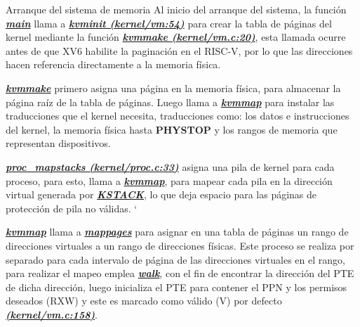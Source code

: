 \documentclass{libs/ufc_format}
\begin{document}
\begin{frame}{Arranque del sistema de memoria}
    Al inicio del arranque del sistema, la función \href{https://github.com/CarlosSandoval-03/xv6-riscv/blob/riscv/kernel/main.c\#L20}{\textbf{\textit{main}}} llama a \href{https://github.com/CarlosSandoval-03/xv6-riscv/blob/riscv/kernel/vm.c\#L54}{\textbf{\textit{kvminit (kernel/vm:54)}}} para crear la tabla de páginas del kernel mediante la función \href{https://github.com/CarlosSandoval-03/xv6-riscv/blob/riscv/kernel/vm.c\#L20}{\textbf{\textit{kvmmake (kernel/vm.c:20)}}}, esta llamada ocurre antes de que XV6 habilite la paginación en el RISC-V, por lo que las direcciones hacen referencia directamente a la memoria física.

    \vspace{0.3cm}

    \href{https://github.com/CarlosSandoval-03/xv6-riscv/blob/riscv/kernel/vm.c\#L20}{\textbf{\textit{kvmmake}}} primero asigna una página en la memoria física, para almacenar la página raíz de la tabla de páginas. Luego llama a \href{https://github.com/CarlosSandoval-03/xv6-riscv/blob/riscv/kernel/vm.c\#L132}{\textbf{\textit{kvmmap}}} para instalar las traducciones que el kernel necesita, traducciones como: los datos e instrucciones del kernel, la memoria física hasta \textbf{PHYSTOP} y los rangos de memoria que representan dispositivos. \cite{xv6_book} \cite{xv6}
\end{frame}
\begin{frame}{}
    \href{https://github.com/CarlosSandoval-03/xv6-riscv/blob/riscv/kernel/proc.c\#L33}{\textbf{\textit{proc\_mapstacks (kernel/proc.c:33)}}} asigna una pila de kernel para cada proceso, para esto, llama a \href{https://github.com/CarlosSandoval-03/xv6-riscv/blob/riscv/kernel/vm.c\#L132}{\textbf{\textit{kvmmap}}}, para mapear cada pila en la dirección virtual generada por \href{https://github.com/CarlosSandoval-03/xv6-riscv/blob/riscv/kernel/memlayout.h\#L56}{\textbf{\textit{KSTACK}}}, lo que deja espacio para las páginas de protección de pila no válidas.
    `
    \vspace{0.3cm}

    \href{https://github.com/CarlosSandoval-03/xv6-riscv/blob/riscv/kernel/vm.c\#L132}{\textbf{\textit{kvmmap}}} llama a \href{https://github.com/CarlosSandoval-03/xv6-riscv/blob/riscv/kernel/vm.c\#L143}{\textbf{\textit{mappages}}} para asignar en una tabla de páginas un rango de direcciones virtuales a un rango de direcciones físicas. Este proceso se realiza por separado para cada intervalo de página de las direcciones virtuales en el rango, para realizar el mapeo emplea \href{https://github.com/CarlosSandoval-03/xv6-riscv/blob/riscv/kernel/vm.c\#L86}{\textbf{\textit{walk}}}, con el fin de encontrar la dirección del PTE de dicha dirección, luego inicializa el PTE para contener el PPN y los permisos deseados (RXW) y este es marcado como válido (V) por defecto \href{https://github.com/CarlosSandoval-03/xv6-riscv/blob/riscv/kernel/vm.c\#L158}{\textbf{\textit{(kernel/vm.c:158)}}}. \cite{xv6_book} \cite{xv6}
\end{frame}
\end{document}
